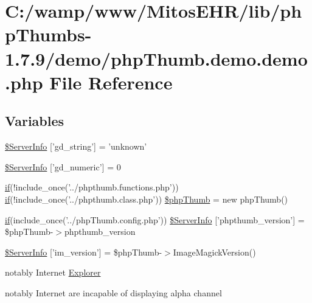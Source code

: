 \hypertarget{php_thumb_8demo_8demo_8php}{\section{\-C\-:/wamp/www/\-Mitos\-E\-H\-R/lib/php\-Thumbs-\/1.7.9/demo/php\-Thumb.demo.\-demo.\-php \-File \-Reference}
\label{php_thumb_8demo_8demo_8php}
}
\subsection*{\-Variables}
\begin{DoxyCompactItemize}
\item 
\hyperlink{php_thumb_8demo_8demo_8php_a486352e90512c78225b57b5f46c70bec}{\$\-Server\-Info} \mbox{[}'gd\-\_\-string'\mbox{]} = 'unknown'
\item 
\hyperlink{php_thumb_8demo_8demo_8php_ab117303405551f61aec5f0c7e18bd881}{\$\-Server\-Info} \mbox{[}'gd\-\_\-numeric'\mbox{]} = 0
\item 
\hyperlink{_setup_8inc_8php_ad0184337b31d13763ec8751feff4aabe}{if}(!include\-\_\-once('../phpthumb.\-functions.\-php')) \*
\hyperlink{_setup_8inc_8php_ad0184337b31d13763ec8751feff4aabe}{if}(!include\-\_\-once('../phpthumb.\-class.\-php')) \hyperlink{php_thumb_8demo_8demo_8php_aa255ed2e2f11993a251707f14a754498}{\$php\-Thumb} = new php\-Thumb()
\item 
\hyperlink{_setup_8inc_8php_ad0184337b31d13763ec8751feff4aabe}{if}(include\-\_\-once('../php\-Thumb.\-config.\-php')) \hyperlink{php_thumb_8demo_8demo_8php_a58d35c9aba80b454eff286f005144fa3}{\$\-Server\-Info} \mbox{[}'phpthumb\-\_\-version'\mbox{]} = \$php\-Thumb-\/$>$phpthumb\-\_\-version
\item 
\hyperlink{php_thumb_8demo_8demo_8php_ad1f321ab5b4c67d74022713a2273b02c}{\$\-Server\-Info} \mbox{[}'im\-\_\-version'\mbox{]} = \$php\-Thumb-\/$>$\-Image\-Magick\-Version()
\item 
notably \-Internet \hyperlink{php_thumb_8demo_8demo_8php_a04d914b3024da4b9dd45f0aa60b152f4}{\-Explorer}
\item 
notably \-Internet are incapable \*
of displaying alpha channel \*

\end{DoxyCompactItemize}
